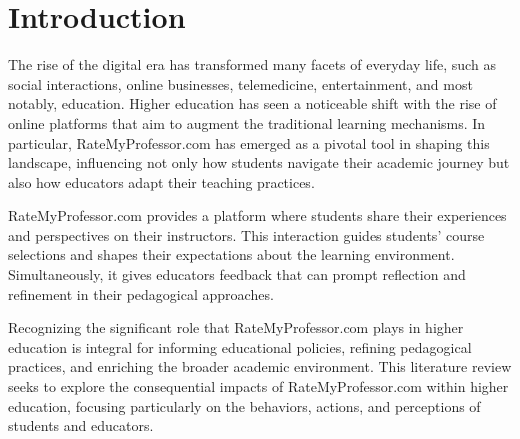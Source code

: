 \documentclass[man, 12pt]{apa7}
\begin{document}






\section{Introduction}
The rise of the digital era has transformed many facets of everyday life, such as social interactions, online businesses, telemedicine, entertainment, and most notably, education. Higher education has seen a noticeable shift with the rise of online platforms that aim to augment the traditional learning mechanisms. In particular, RateMyProfessor.com has emerged as a pivotal tool in shaping this landscape, influencing not only how students navigate their academic journey but also how educators adapt their teaching practices.

RateMyProfessor.com provides a platform where students share their experiences and perspectives on their instructors. This interaction guides students' course selections and shapes their expectations about the learning environment. Simultaneously, it gives educators feedback that can prompt reflection and refinement in their pedagogical approaches.

Recognizing the significant role that RateMyProfessor.com plays in higher education is integral for informing educational policies, refining pedagogical practices, and enriching the broader academic environment. This literature review seeks to explore the consequential impacts of RateMyProfessor.com within higher education, focusing particularly on the behaviors, actions, and perceptions of students and educators.
\end{document}
